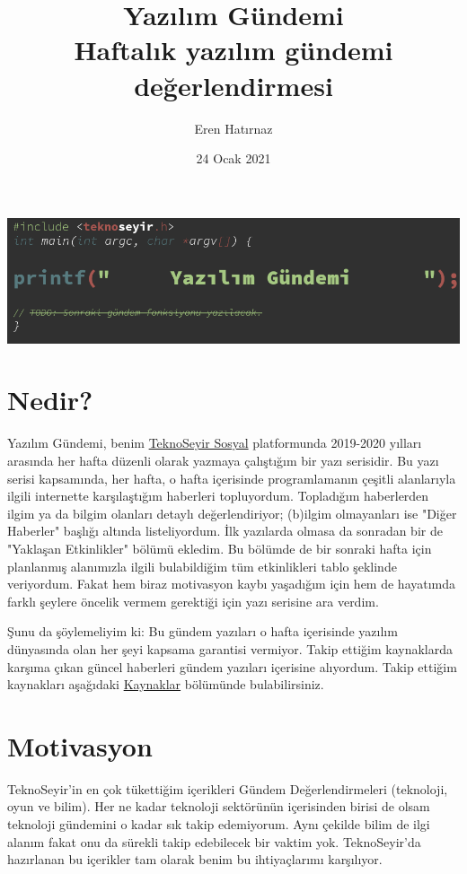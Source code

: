 \documentclass[11pt]{article}
\author{Eren Hatırnaz}
\date{24 Ocak 2021}
\title{Yazılım Gündemi\\\medskip
\large Haftalık yazılım gündemi değerlendirmesi}
\begin{document}
\maketitle
\shorthandoff{=}
\begin{center}
\includegraphics[width=.9\linewidth]{img/yazilim-gundemi-logo.png}
\end{center}

\section*{Nedir?}
\label{sec:org5353d6b}
Yazılım Gündemi, benim \href{https://teknoseyir.com/u/erenhatirnaz/blog}{TeknoSeyir Sosyal} platformunda 2019-2020 yılları
arasında her hafta düzenli olarak yazmaya çalıştığım bir yazı serisidir. Bu
yazı serisi kapsamında, her hafta, o hafta içerisinde programlamanın çeşitli
alanlarıyla ilgili internette karşılaştığım haberleri topluyordum. Topladığım
haberlerden ilgim ya da bilgim olanları detaylı değerlendiriyor; (b)ilgim
olmayanları ise "Diğer Haberler" başlığı altında listeliyordum. İlk yazılarda
olmasa da sonradan bir de "Yaklaşan Etkinlikler" bölümü ekledim. Bu bölümde de
bir sonraki hafta için planlanmış alanımızla ilgili bulabildiğim tüm
etkinlikleri tablo şeklinde veriyordum. Fakat hem biraz motivasyon kaybı
yaşadığım için hem de hayatımda farklı şeylere öncelik vermem gerektiği için
yazı serisine ara verdim.

Şunu da şöylemeliyim ki: Bu gündem yazıları o hafta içerisinde yazılım
dünyasında olan her şeyi kapsama garantisi vermiyor. Takip ettiğim
kaynaklarda karşıma çıkan güncel haberleri gündem yazıları içerisine
alıyordum. Takip ettiğim kaynakları aşağıdaki \hyperref[sec:org2a0bcb1]{Kaynaklar} bölümünde
bulabilirsiniz.
\section*{Motivasyon}
\label{sec:orgfa520f8}
TeknoSeyir'in en çok tükettiğim içerikleri Gündem Değerlendirmeleri
(teknoloji, oyun ve bilim). Her ne kadar teknoloji sektörünün içerisinden
birisi de olsam teknoloji gündemini o kadar sık takip edemiyorum. Aynı çekilde
bilim de ilgi alanım fakat onu da sürekli takip edebilecek bir vaktim yok.
TeknoSeyir'da hazırlanan bu içerikler tam olarak benim bu ihtiyaçlarımı
karşılıyor.
\end{document}

